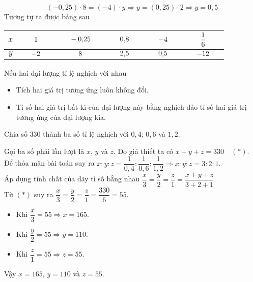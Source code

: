 \begin{vd}
{\begin{itemize}
			$$\left(-0{,}25\right)\cdot 8 = \left(- 4\right)\cdot y\Rightarrow y = \left(0{,}25\right)\cdot 2\Rightarrow y = 0{,}5$$
			Tương tự ta được bảng sau
			\begin{center} \renewcommand{\arraystretch}{2}
				\begin{tabular}{|c|c|c|c|c|c|}
					\hline
					$x$& ${\hskip 0.5 cm}1{\hskip 0.5 cm}$ & ${\hskip 0.5 cm}- 0{,}25{\hskip 0.5 cm}$ & ${\hskip 0.5 cm}{0{,}8 }{\hskip 0.5 cm}$& ${\hskip 0.5 cm}{- 4}{\hskip 0.5 cm}$& ${\hskip 0.5 cm}{\dfrac{1}{6}}{\hskip 0.5 cm}$\\
					\hline
					$y$& ${\hskip 0.5 cm}{-2}{\hskip 0.5 cm}$ & ${\hskip 0.5 cm}8{\hskip 0.5 cm}$ & ${\hskip 0.5 cm}2{,}5{\hskip 0.5 cm}$ & ${\hskip 0.5 cm}{0{,}5}{\hskip 0.5 cm}$& ${\hskip 0.5 cm}{-12 }{\hskip 0.5 cm}$\\
					\hline
				\end{tabular}
			\end{center}	
		\end{itemize}
	}
\end{vd}
\begin{note} 
Nếu hai đại lượng tỉ lệ nghịch với nhau
	\begin{itemize}
		\item Tích hai giá trị tương ứng luôn không đổi.
		\item Tỉ số hai giá trị bất kì của đại lượng này bằng nghịch đảo tỉ số hai giá trị tương ứng của đại lượng kia.
	\end{itemize}
\end{note}
\begin{vd}%
Chia số $330$ thành ba số tỉ lệ nghịch với $0{,}4$; $0{,}6$ và $1{,}2$.	
	\loigiai
	{Gọi ba số phải lần lượt là $x$, $y$ và $z$. Do giả thiết ta có $x + y + z = 330\quad (*)$.\\
Để thỏa mãn bài toán suy ra $x\colon y\colon z = \dfrac{1}{0{,}4}\colon \dfrac{1}{0{,}6}\colon \dfrac{1}{1{,}2}\Rightarrow x\colon y\colon z = 3\colon 2\colon 1$.\\
Áp dụng tính chất của dãy tỉ số bằng nhau $\dfrac{x}{3} = \dfrac{y}{2} = \dfrac{z}{1} = \dfrac{x + y + z}{3 + 2 + 1}$.\\
Từ $(*)$ suy ra  $\dfrac{x}{3} = \dfrac{y}{2} = \dfrac{z}{1} = \dfrac{330}{6} = 55$.
\begin{itemize}
	\item Khi $\dfrac{x}{3}= 55\Rightarrow x = 165$.
	\item Khi $\dfrac{y}{2} = 55\Rightarrow y = 110$.
	\item  Khi $\dfrac{z}{1} = 55\Rightarrow z = 55$.
\end{itemize}
Vậy $x = 165$, $y = 110$ và $z = 55$.
	}
\end{vd}
